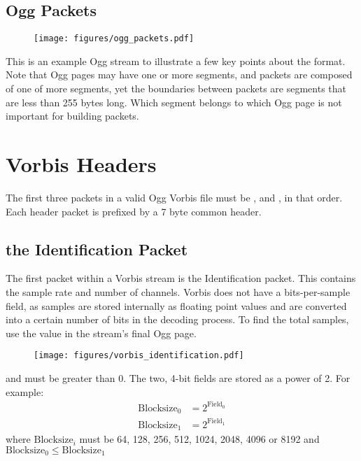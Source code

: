 \subsection{Ogg Packets}
\begin{figure}[h]
\texttt{[image: figures/ogg\_packets.pdf]}
\end{figure}
\par
\noindent
This is an example Ogg stream to illustrate a few key points about
the format.
Note that Ogg pages may have one or more segments,
and packets are composed of one of more segments,
yet the boundaries between packets are segments
that are less than 255 bytes long.
Which segment belongs to which Ogg page is not important
for building packets.

\section{Vorbis Headers}

The first three packets in a valid Ogg Vorbis file must be
,  and , in that order.
Each header packet is prefixed by a 7 byte common header.

\clearpage

\subsection{the Identification Packet}
The first packet within a Vorbis stream is the Identification packet.
This contains the sample rate and number of channels.
Vorbis does not have a bits-per-sample field, as samples
are stored internally as floating point values and are
converted into a certain number of bits in the decoding process.
To find the total samples, use the  value
in the stream's final Ogg page.
\begin{figure}[h]
\texttt{[image: figures/vorbis\_identification.pdf]}
\end{figure}
\par
\noindent
{} and  must be greater than 0.
The two, 4-bit  fields are stored as a power of 2.
For example:
\begin{align*}
\text{Blocksize}_0 &= 2 ^ {\text{Field}_0} \\
\text{Blocksize}_1 &= 2 ^ {\text{Field}_1}
\end{align*}
where $\text{Blocksize}_i$ must be 64, 128, 256, 512, 1024, 2048, 4096 or 8192
and
\linebreak
$\text{Blocksize}_0 \leq \text{Blocksize}_1$

